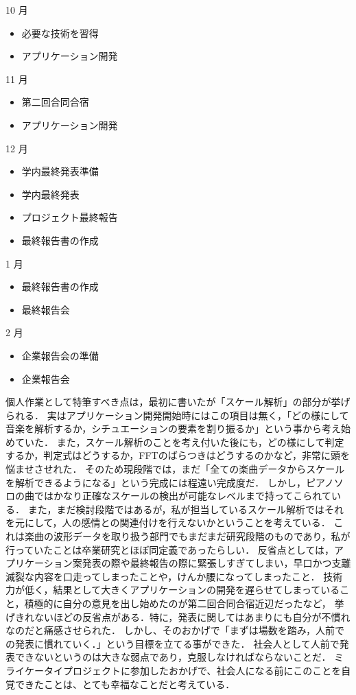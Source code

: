 10 月
\begin{itemize}
\item 必要な技術を習得
\item アプリケーション開発
\end{itemize}
11 月
\begin{itemize}
\item 第二回合同合宿
\item アプリケーション開発
\end{itemize}
12 月
\begin{itemize}
\item 学内最終発表準備
\item 学内最終発表
\item プロジェクト最終報告
\item 最終報告書の作成
\end{itemize}
1 月
\begin{itemize}
\item 最終報告書の作成
\item 最終報告会
\end{itemize}
2 月
\begin{itemize}
\item 企業報告会の準備
\item 企業報告会
\end{itemize}
個人作業として特筆すべき点は，最初に書いたが「スケール解析」の部分が挙げられる．
実はアプリケーション開発開始時にはこの項目は無く，「どの様にして音楽を解析するか，シチュエーションの要素を割り振るか」という事から考え始めていた．
また，スケール解析のことを考え付いた後にも，どの様にして判定するか，判定式はどうするか，FFTのばらつきはどうするのかなど，非常に頭を悩ませさせれた．
そのため現段階では，まだ「全ての楽曲データからスケールを解析できるようになる」という完成には程遠い完成度だ．
しかし，ピアノソロの曲ではかなり正確なスケールの検出が可能なレベルまで持ってこられている．
また，まだ検討段階ではあるが，私が担当しているスケール解析ではそれを元にして，人の感情との関連付けを行えないかということを考えている．
これは楽曲の波形データを取り扱う部門でもまだまだ研究段階のものであり，私が行っていたことは卒業研究とほぼ同定義であったらしい．
反省点としては，アプリケーション案発表の際や最終報告の際に緊張しすぎてしまい，早口かつ支離滅裂な内容を口走ってしまったことや，けんか腰になってしまったこと．
技術力が低く，結果として大きくアプリケーションの開発を遅らせてしまっていること，積極的に自分の意見を出し始めたのが第二回合同合宿近辺だったなど，
挙げきれないほどの反省点がある．特に，発表に関してはあまりにも自分が不慣れなのだと痛感させられた．
しかし、そのおかげで「まずは場数を踏み，人前での発表に慣れていく．」という目標を立てる事ができた．
社会人として人前で発表できないというのは大きな弱点であり，克服しなければならないことだ．
ミライケータイプロジェクトに参加したおかげで、社会人になる前にこのことを自覚できたことは、とても幸福なことだと考えている．\par
{}
